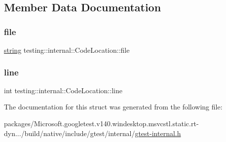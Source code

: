 \subsection{Member Data Documentation}
\mbox{\label{structtesting_1_1internal_1_1_code_location_ab8a24d5e63295e411d37578dbb9427c0}} 
\subsubsection{\texorpdfstring{file}{file}}
{\footnotesize\ttfamily \mbox{\hyperlink{namespacetesting_1_1internal_a8e8ff5b11e64078831112677156cb111}{string}} testing\+::internal\+::\+Code\+Location\+::file}

\mbox{\label{structtesting_1_1internal_1_1_code_location_a01c977c7e8834a05a6d6c40b0c416045}} 
\subsubsection{\texorpdfstring{line}{line}}
{\footnotesize\ttfamily int testing\+::internal\+::\+Code\+Location\+::line}



The documentation for this struct was generated from the following file\+:\begin{DoxyCompactItemize}
\item 
packages/\+Microsoft.\+googletest.\+v140.\+windesktop.\+msvcstl.\+static.\+rt-\/dyn.../build/native/include/gtest/internal/\mbox{\hyperlink{gtest-internal_8h}{gtest-\/internal.\+h}}\end{DoxyCompactItemize}
